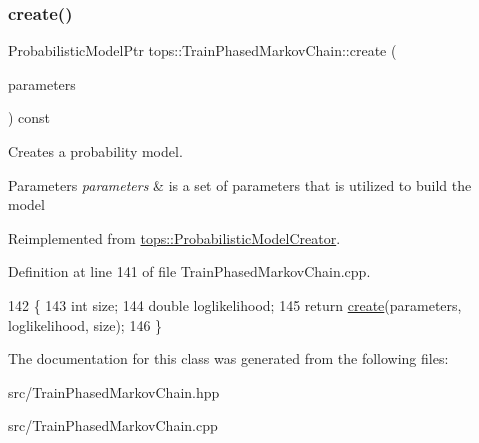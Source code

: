 \subsubsection{\texorpdfstring{create()}{create()}}
{\footnotesize\ttfamily Probabilistic\+Model\+Ptr tops\+::\+Train\+Phased\+Markov\+Chain\+::create (\begin{DoxyParamCaption}\item[{\hyperlink{classtops_1_1ProbabilisticModelParameters}{Probabilistic\+Model\+Parameters} \&}]{parameters }\end{DoxyParamCaption}) const\hspace{0.3cm}{\ttfamily [virtual]}}



Creates a probability model. 


\begin{DoxyParams}{Parameters}
{\em parameters} & is a set of parameters that is utilized to build the model \\
\hline
\end{DoxyParams}


Reimplemented from \hyperlink{classtops_1_1ProbabilisticModelCreator_afed6c8ffa45fff446bdaa8b533da8f7c}{tops\+::\+Probabilistic\+Model\+Creator}.



Definition at line 141 of file Train\+Phased\+Markov\+Chain.\+cpp.


\begin{DoxyCode}
142                                                                  \{
143         \textcolor{keywordtype}{int} size;
144         \textcolor{keywordtype}{double} loglikelihood;
145         \textcolor{keywordflow}{return} \hyperlink{classtops_1_1TrainPhasedMarkovChain_a31219afb1abf369674c2862a5017a112}{create}(parameters, loglikelihood, size);
146 \}
\end{DoxyCode}


The documentation for this class was generated from the following files\+:\begin{DoxyCompactItemize}
\item 
src/Train\+Phased\+Markov\+Chain.\+hpp\item 
src/Train\+Phased\+Markov\+Chain.\+cpp\end{DoxyCompactItemize}
